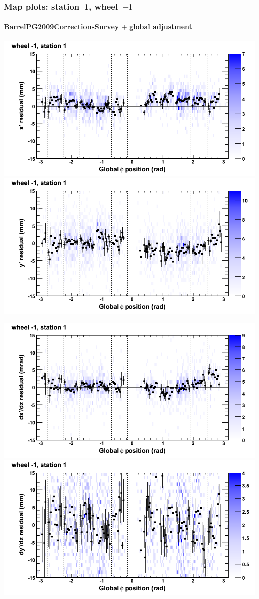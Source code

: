 \documentclass[compress]{beamer}
\begin{document}
\begin{frame}
\frametitle{Map plots: station~1, wheel~$-1$}
\framesubtitle{BarrelPG2009CorrectionsSurvey $+$ global adjustment}
\includegraphics[width=0.5\linewidth]{mapplots_re01/DTvsphi_st1whB_x.png}
\includegraphics[width=0.5\linewidth]{mapplots_re01/DTvsphi_st1whB_y.png}

\includegraphics[width=0.5\linewidth]{mapplots_re01/DTvsphi_st1whB_dxdz.png}
\includegraphics[width=0.5\linewidth]{mapplots_re01/DTvsphi_st1whB_dydz.png}
\end{frame}
\end{document}

